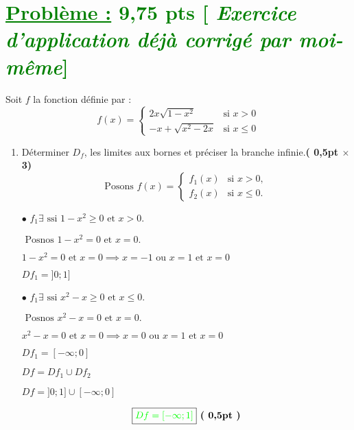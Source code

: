 \documentclass[12pt,a4paper]{article}
\begin{document}
\section*{\textcolor{green}{\underline{Problème :} 9,75 pts [\textit{ Exercice d'application déjà corrigé par moi-même}]}}
Soit $f$ la fonction définie par :
\[
f(x) =
\begin{cases} 
2x\sqrt{1 - x^2} & \text{si } x > 0 \\ 
-x + \sqrt{x^2 - 2x} & \text{si } x \leq 0 
\end{cases}
\]
\begin{enumerate}
\item Déterminer $D_f$, les limites aux bornes et préciser la branche infinie.\hfill \textbf{( 0,5pt $\times$ 3)}
\[\text{Posons }
f(x) =
\begin{cases} 
f_1(x) & \text{si } x > 0, \\ 
f_2(x) & \text{si } x \leq 0.
\end{cases}
\]

\( \bullet \) \(f_1 \exists \text{ ssi } 1 - x^2 \geq 0 \text{ et } x > 0. \)

\(\text{ Posnos } 1 - x^2 = 0 \text{ et } x = 0. \)

\( 1 - x^2 = 0 \text{ et } x = 0 \implies x = -1 \text{ ou } x = 1 \text{ et } x = 0 \)

    
    \underline{\( Df_1 = ]0;1] \)}
    
\( \bullet \) \(f_1 \exists \text{ ssi } x^2 - x \geq 0 \text{ et } x \leq 0. \) 

\(\text{ Posnos } x^2 - x = 0 \text{ et } x = 0. \)

\( x^2 - x = 0 \text{ et } x = 0 \implies x = 0 \text{ ou } x = 1 \text{ et } x = 0 \)  

    
    \underline{\( Df_1 = [-\infty;0] \)}
	    
	\( Df = Df_1 \cup Df_2 \)    
    
    \( Df = ]0;1] \cup [-\infty;0] \)
    
    \[ \boxed{\textcolor{green}{Df = [-\infty;1]}} \textbf{ ( 0,5pt )} \] 
    
\end{enumerate}
\end{document}
